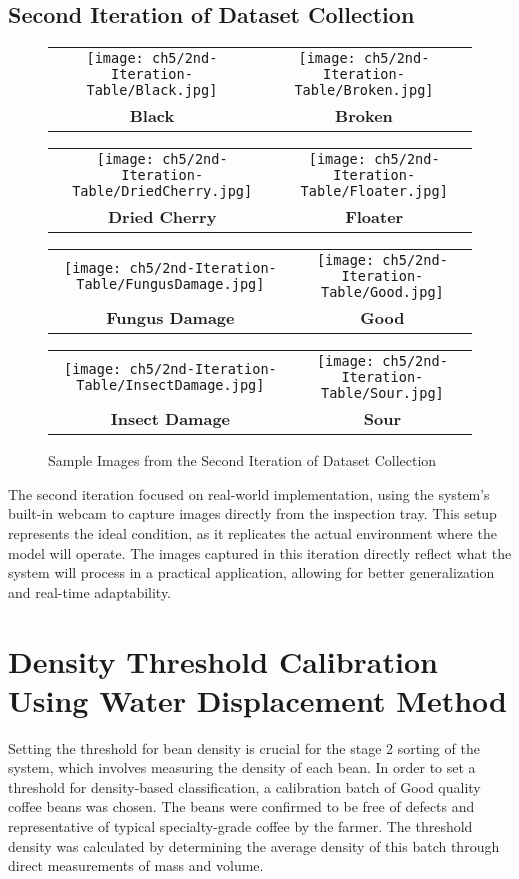 \subsection{Second Iteration of Dataset Collection}
\begin{figure}[H]
	\centering
	\begin{tabular}{cc}
		\texttt{[image: ch5/2nd-Iteration-Table/Black.jpg]} &
		\texttt{[image: ch5/2nd-Iteration-Table/Broken.jpg]} \\
		\textbf{Black}  & \textbf{Broken} \\[6pt]
	\end{tabular}
	\begin{tabular}{cc}
		\texttt{[image: ch5/2nd-Iteration-Table/DriedCherry.jpg]} &
		\texttt{[image: ch5/2nd-Iteration-Table/Floater.jpg]} \\
		\textbf{Dried Cherry}  & \textbf{Floater} \\[6pt]
	\end{tabular}
	\begin{tabular}{cc}
		\texttt{[image: ch5/2nd-Iteration-Table/FungusDamage.jpg]} &
		\texttt{[image: ch5/2nd-Iteration-Table/Good.jpg]} \\
		\textbf{Fungus Damage}  & \textbf{Good} \\[6pt]
	\end{tabular}
	\begin{tabular}{cc}
		\texttt{[image: ch5/2nd-Iteration-Table/InsectDamage.jpg]} &
		\texttt{[image: ch5/2nd-Iteration-Table/Sour.jpg]} \\
		\textbf{Insect Damage}  & \textbf{Sour} \\[6pt]
	\end{tabular}
	\caption{Sample Images from the Second Iteration of Dataset Collection}
\end{figure}

The second iteration focused on real-world implementation, using the system's built-in webcam to capture images directly from the inspection tray. This setup represents the ideal condition, as it replicates the actual environment where the model will operate. The images captured in this iteration directly reflect what the system will process in a practical application, allowing for better generalization and real-time adaptability.

\section{Density Threshold Calibration Using Water Displacement Method}
\label{sec:density_threshold_calibration}
Setting the threshold for bean density is crucial for the stage 2 sorting of the system, which involves measuring the density of each bean. In order to set a threshold for density-based classification, a calibration batch of Good quality coffee beans was chosen. The beans were confirmed to be free of defects and representative of typical specialty-grade coffee by the farmer. The threshold density was calculated by determining the average density of this batch through direct measurements of mass and volume.

